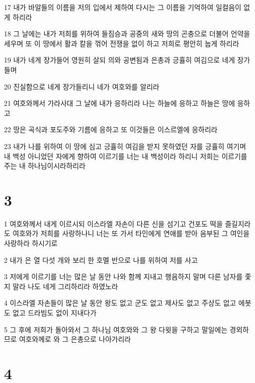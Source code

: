 \par 17 내가 바알들의 이름을 저의 입에서 제하여 다시는 그 이름을 기억하여 일컬음이 없게 하리라
\par 18 그 날에는 내가 저희를 위하여 들짐승과 공중의 새와 땅의 곤충으로 더불어 언약을 세우며 또 이 땅에서 활과 칼을 꺾어 전쟁을 없이 하고 저희로 평안히 눕게 하리라
\par 19 내가 네게 장가들어 영원히 살되 의와 공변됨과 은총과 긍휼히 여김으로 네게 장가들며
\par 20 진실함으로 네게 장가들리니 네가 여호와를 알리라
\par 21 여호와께서 가라사대 그 날에 내가 응하리라 나는 하늘에 응하고 하늘은 땅에 응하고
\par 22 땅은 곡식과 포도주와 기름에 응하고 또 이것들은 이스르엘에 응하리라
\par 23 내가 나를 위하여 이 땅에 심고 긍휼히 여김을 받지 못하였던 자를 긍휼히 여기며 내 백성 아니었던 자에게 향하여 이르기를 너는 내 백성이라 하리니 저희는 이르기를 주는 내 하나님이시라하리라

\chapter{3}

\par 1 여호와께서 내게 이르시되 이스라엘 자손이 다른 신을 섬기고 건포도 떡을 즐길지라도 여호와가 저희를 사랑하나니 너는 또 가서 타인에게 연애를 받아 음부된 그 여인을 사랑하라 하시기로
\par 2 내가 은 열 다섯 개와 보리 한 호멜 반으로 나를 위하여 저를 사고
\par 3 저에게 이르기를 너는 많은 날 동안 나와 함께 지내고 행음하지 말며 다른 남자를 좇지 말라 나도 네게 그리하리라 하였노라
\par 4 이스라엘 자손들이 많은 날 동안 왕도 없고 군도 없고 제사도 없고 주상도 없고 에봇도 없고 드라빔도 없이 지내다가
\par 5 그 후에 저희가 돌아와서 그 하나님 여호와와 그 왕 다윗을 구하고 말일에는 경외하므로 여호와께로 와 그 은총으로 나아가리라

\chapter{4}

